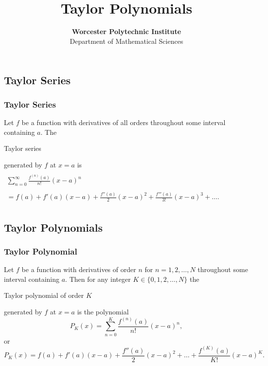 \documentclass{beamer}
\title{Taylor Polynomials}
\author[Calculus Labs]{{\textbf{Worcester Polytechnic Institute}\\ Department of Mathematical Sciences}}
\institute[WPI]
{Calculus Labs}
\date{}
\begin{document}
\frame{\titlepage}




\begin{frame}
\section{Taylor Series}
\frametitle{Taylor Series}
\begin{definition} Let $f$ be a function with derivatives of all orders throughout some interval containing $a$.  \newline The \begin{bf}Taylor series\end{bf} generated by $f$ at $x=a$ is
$\begin{array}{l}
		\\
	\displaystyle \sum_{n=0}^\infty \frac{f^{(n)}(a)}{n!}(x-a)^n \\
		\\
	\displaystyle  = f(a) + f'(a)(x-a) + \frac{f''(a)}{2}(x-a)^2 + \frac{f'''(a)}{3!}(x-a)^3 + \dots. \\
\end{array}$
\end{definition}

\vspace{5.5 cm}
\end{frame}




\begin{frame}
\section{Taylor Polynomials}
\frametitle{Taylor Polynomial}
\begin{definition}
Let $f$ be a function with derivatives of order $n$ for \newline $n=1,2,\dots,N$ throughout some interval containing $a$.  Then for any integer $K \in \{0,1,2,\dots,N\}$ the \begin{bf}Taylor polynomial of order $K$\end{bf} generated by $f$ at $x=a$ is the polynomial
\begin{equation}
	P_K(x) = \sum_{n=0}^K \frac{f^{(n)}(a)}{n!}(x-a)^n ,
\end{equation}
or
\begin{equation}
	P_K(x)  = f(a) + f'(a)(x-a) + \frac{f''(a)}{2}(x-a)^2 + \dots + \frac{f^{(K)}(a)}{K!}(x-a)^K.
\end{equation}
\end{definition}

\vspace{5.5 cm}
\end{frame}
\end{document}
